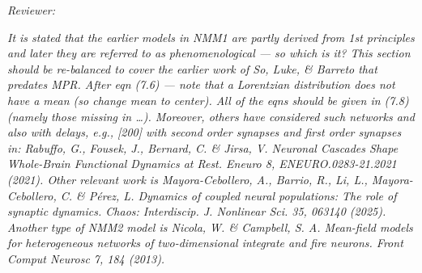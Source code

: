 \documentclass[12pt,a4paper]{article}
\newcommand{\reviewercomment}[1]{\par\smallskip\noindent\textit{Reviewer:}\par\smallskip\begingroup\itshape #1\par\endgroup\smallskip}
\begin{document}
\reviewercomment{It is stated that the earlier models in NMM1 are partly derived from 1st principles and later they are referred to as phenomenological --- so which is it? This section should be re-balanced to cover the earlier work of So, Luke, \& Barreto that predates MPR. After eqn (7.6) --- note that a Lorentzian distribution does not have a mean (so change mean to center). All of the eqns should be given in (7.8) (namely those missing in \dots). Moreover, others have considered such networks and also with delays, e.g., [200] with second order synapses and first order synapses in: Rabuffo, G., Fousek, J., Bernard, C. \& Jirsa, V. Neuronal Cascades Shape Whole-Brain Functional Dynamics at Rest. Eneuro 8, ENEURO.0283-21.2021 (2021). Other relevant work is Mayora-Cebollero, A., Barrio, R., Li, L., Mayora-Cebollero, C. \& P\'{e}rez, L. Dynamics of coupled neural populations: The role of synaptic dynamics. Chaos: Interdiscip. J. Nonlinear Sci. 35, 063140 (2025). Another type of NMM2 model is Nicola, W. \& Campbell, S. A. Mean-field models for heterogeneous networks of two-dimensional integrate and fire neurons. Front Comput Neurosc 7, 184 (2013).}
\end{document}
